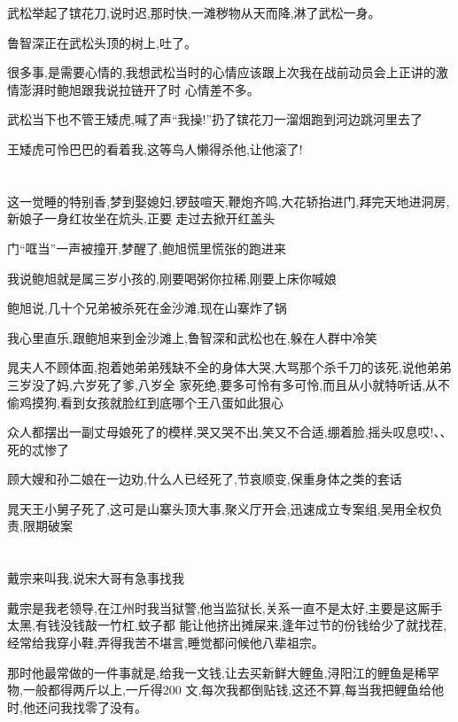 ﻿\documentclass[12pt]{article}
\begin{document}
武松举起了镔花刀,说时迟,那时快,一滩秽物从天而降,淋了武松一身。

鲁智深正在武松头顶的树上,吐了。

很多事,是需要心情的,我想武松当时的心情应该跟上次我在战前动员会上正讲的激情澎湃时鲍旭跟我说拉链开了时
心情差不多。

武松当下也不管王矮虎,喊了声``我操!''扔了镔花刀一溜烟跑到河边跳河里去了

王矮虎可怜巴巴的看着我,这等鸟人懒得杀他,让他滚了!

\section{}

这一觉睡的特别香,梦到娶媳妇,锣鼓喧天,鞭炮齐鸣,大花轿抬进门,拜完天地进洞房,新娘子一身红妆坐在炕头,正要
走过去掀开红盖头\dldots

门``哐当''一声被撞开,梦醒了,鲍旭慌里慌张的跑进来

我说鲍旭就是属三岁小孩的,刚要喝粥你拉稀,刚要上床你喊娘

鲍旭说,几十个兄弟被杀死在金沙滩,现在山寨炸了锅\dldots

我心里直乐,跟鲍旭来到金沙滩上,鲁智深和武松也在,躲在人群中冷笑

晁夫人不顾体面,抱着她弟弟残缺不全的身体大哭,大骂那个杀千刀的该死,说他弟弟三岁没了妈,六岁死了爹,八岁全
家死绝,要多可怜有多可怜,而且从小就特听话,从不偷鸡摸狗,看到女孩就脸红\dldots 到底哪个王八蛋如此狠心
\dldots

众人都摆出一副丈母娘死了的模样,哭又哭不出,笑又不合适,绷着脸,摇头叹息\dldots 哎!、、死的忒惨了\dldots

顾大嫂和孙二娘在一边劝,什么人已经死了,节哀顺变,保重身体之类的套话\dldots

晁天王小舅子死了,这可是山寨头顶大事,聚义厅开会,迅速成立专案组,吴用全权负责,限期破案\dldots

\section{}

戴宗来叫我,说宋大哥有急事找我

戴宗是我老领导,在江州时我当狱警,他当监狱长,关系一直不是太好,主要是这厮手太黑,有钱没钱敲一竹杠,蚊子都
能让他挤出摊屎来,逢年过节的份钱给少了就找茬,经常给我穿小鞋,弄得我苦不堪言,睡觉都问候他八辈祖宗。

那时他最常做的一件事就是,给我一文钱,让去买新鲜大鲤鱼,浔阳江的鲤鱼是稀罕物,一般都得两斤以上,一斤得200
文,每次我都倒贴钱,这还不算,每当我把鲤鱼给他时,他还问我找零了没有。
\end{document}
